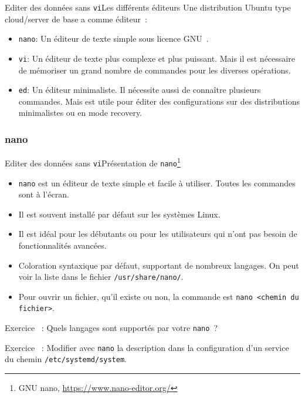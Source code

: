 \documentclass{beamer}
\begin{document}
    \begin{frame}{Editer des données sans \lstinline{vi}}{Les différents éditeurs}
        Une distribution Ubuntu type cloud/server de base a comme éditeur~:
        \begin{itemize}
            \item \lstinline{nano}: Un éditeur de texte simple sous licence GNU~.
            \item \lstinline{vi}: Un éditeur de texte plus complexe et plus puissant.
            Mais il est nécessaire de mémoriser un grand nombre de commandes pour les diverses opérations.
            \item \lstinline{ed}: Un éditeur minimaliste.
            Il nécessite aussi de connaître plusieurs commandes.
            Mais est utile pour éditer des configurations sur des distributions minimalistes ou en mode recovery.
        \end{itemize}
    \end{frame}

    \subsubsection{nano}\label{subsubsec:nano}
    \begin{frame}{Editer des données sans \lstinline{vi}}{Présentation de \lstinline{nano}\footnote{\label{nano}GNU nano, \url{https://www.nano-editor.org/}}}
        \begin{itemize}
            \item \lstinline{nano} est un éditeur de texte simple et facile à utiliser.
            Toutes les commandes sont à l'écran.
            \item Il est souvent installé par défaut sur les systèmes Linux.
            \item Il est idéal pour les débutants ou pour les utilisateurs qui n'ont pas besoin de fonctionnalités avancées.
            \item Coloration syntaxique par défaut, supportant de nombreux langages.
            On peut voir la liste dans le fichier \lstinline{/usr/share/nano/}.
            \item Pour ouvrir un fichier, qu'il existe ou non, la commande est \lstinline{nano <chemin du fichier>}.
        \end{itemize}
        Exercice \execcounterdispinc~: Quels langages sont supportés par votre \lstinline{nano}~?

        Exercice \execcounterdispinc~: Modifier avec \lstinline{nano} la description dans la configuration d'un service du chemin \lstinline{/etc/systemd/system}.
    \end{frame}
\end{document}
